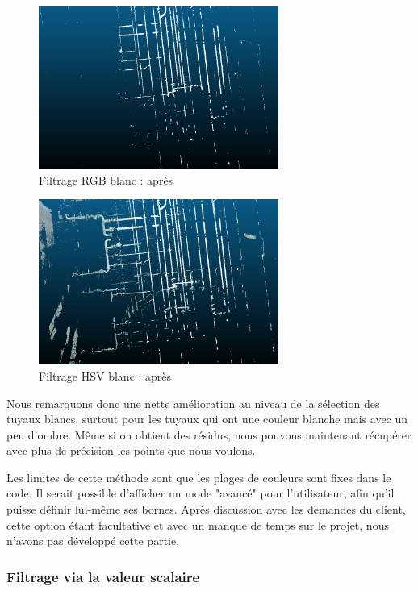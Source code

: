 \documentclass[12pt,titlepage,french]{article}
\begin{document}
\begin{figure}[H]
\center
\includegraphics[width=0.7\textwidth]{./img/3_white.PNG}
\caption{\label{} Filtrage RGB blanc : après}
\end{figure}

\begin{figure}[H]
\center
\includegraphics[width=0.7\textwidth]{./img/2_white.PNG}
\caption{\label{} Filtrage HSV blanc : après}
\end{figure}

Nous remarquons donc une nette amélioration au niveau de la sélection des tuyaux blancs, surtout pour les tuyaux qui ont une couleur blanche mais avec un peu d'ombre. Même si on obtient des résidus, nous pouvons maintenant récupérer avec plus de précision les points que nous voulons. \newline

Les limites de cette méthode sont que les plages de couleurs sont fixes dans le code. Il serait possible d'afficher un mode "avancé" pour l'utilisateur, afin qu'il puisse définir lui-même ses bornes. Après discussion avec les demandes du client, cette option étant facultative et avec un manque de temps sur le projet, nous n'avons pas développé cette partie.

\subsubsection{Filtrage via la valeur scalaire}
\end{document}
